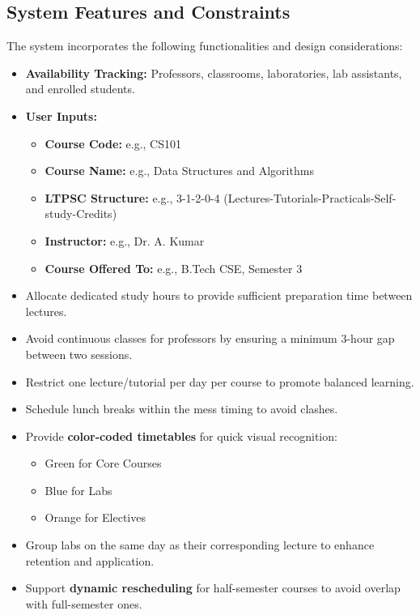 \documentclass[12pt]{article}
\begin{document}
\subsection{System Features and Constraints} 
The system incorporates the following functionalities and design considerations:
\begin{itemize}
    \item \textbf{Availability Tracking:} Professors, classrooms, laboratories, lab assistants, and enrolled students.
    \item \textbf{User Inputs:}
    \begin{itemize}
        \item \textbf{Course Code:} e.g., CS101
        \item \textbf{Course Name:} e.g., Data Structures and Algorithms
        \item \textbf{LTPSC Structure:} e.g., 3-1-2-0-4 (Lectures-Tutorials-Practicals-Self-study-Credits)
        \item \textbf{Instructor:} e.g., Dr. A. Kumar
        \item \textbf{Course Offered To:} e.g., B.Tech CSE, Semester 3
    \end{itemize}
    \item Allocate dedicated study hours to provide sufficient preparation time between lectures.
    \item Avoid continuous classes for professors by ensuring a minimum 3-hour gap between two sessions.
    \item Restrict one lecture/tutorial per day per course to promote balanced learning.
    \item Schedule lunch breaks within the mess timing to avoid clashes.
    \item Provide \textbf{color-coded timetables} for quick visual recognition:
    \begin{itemize}
        \item \textcolor{coregreen}{Green for Core Courses}
        \item \textcolor{labblue}{Blue for Labs}
        \item \textcolor{electiveorange}{Orange for Electives}
    \end{itemize}
    \item Group labs on the same day as their corresponding lecture to enhance retention and application.
    \item Support \textbf{dynamic rescheduling} for half-semester courses to avoid overlap with full-semester ones.

\end{itemize}
\end{document}
